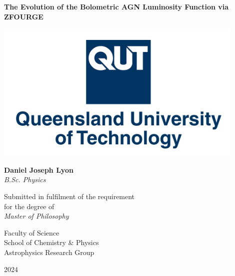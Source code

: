 \begin{titlepage}
    \begin{center}
    
        {\huge{\textbf{The Evolution of \vspace{1mm} the Bolometric AGN Luminosity Function via ZFOURGE}}}\\
        \vspace{1.5cm}

        \includegraphics[width=12cm]{Figures/QUT Emblem.jpg}\\
        \vspace{1.5cm}

        \large{\textbf{Daniel Joseph Lyon}}\\
        \textit{B.Sc. Physics}\\
        \vspace{1.5cm}

        Submitted in fulfilment of the requirement \\ for the degree of\\
        \vspace{1cm}
        \textit{Master of Philosophy}\\
        \vspace{2cm}

        \small{Faculty of Science}\\
        School of Chemistry \& Physics\\
        Astrophysics Research Group\\
        \vfill
        
        \large{2024}
            
    \end{center}
\end{titlepage}